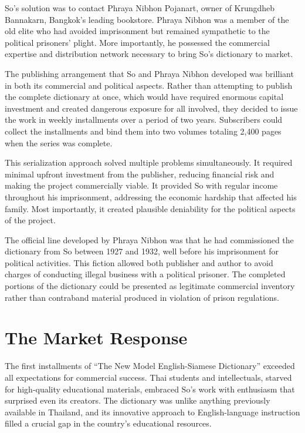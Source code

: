 \documentclass[
  Letterpaper,
]{scrbook}
\begin{document}
So's solution was to contact Phraya Nibhon Pojanart, owner of Krungdheb
Bannakarn, Bangkok's leading bookstore. Phraya Nibhon was a member of
the old elite who had avoided imprisonment but remained sympathetic to
the political prisoners' plight. More importantly, he possessed the
commercial expertise and distribution network necessary to bring So's
dictionary to market.

The publishing arrangement that So and Phraya Nibhon developed was
brilliant in both its commercial and political aspects. Rather than
attempting to publish the complete dictionary at once, which would have
required enormous capital investment and created dangerous exposure for
all involved, they decided to issue the work in weekly installments over
a period of two years. Subscribers could collect the installments and
bind them into two volumes totaling 2,400 pages when the series was
complete.

This serialization approach solved multiple problems simultaneously. It
required minimal upfront investment from the publisher, reducing
financial risk and making the project commercially viable. It provided
So with regular income throughout his imprisonment, addressing the
economic hardship that affected his family. Most importantly, it created
plausible deniability for the political aspects of the project.

The official line developed by Phraya Nibhon was that he had
commissioned the dictionary from So between 1927 and 1932, well before
his imprisonment for political activities. This fiction allowed both
publisher and author to avoid charges of conducting illegal business
with a political prisoner. The completed portions of the dictionary
could be presented as legitimate commercial inventory rather than
contraband material produced in violation of prison regulations.

\section{The Market Response}\label{the-market-response}

The first installments of ``The New Model English-Siamese Dictionary''
exceeded all expectations for commercial success. Thai students and
intellectuals, starved for high-quality educational materials, embraced
So's work with enthusiasm that surprised even its creators. The
dictionary was unlike anything previously available in Thailand, and its
innovative approach to English-language instruction filled a crucial gap
in the country's educational resources.
\end{document}
